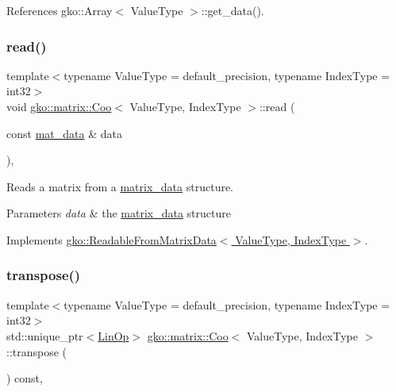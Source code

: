 References gko\+::\+Array$<$ Value\+Type $>$\+::get\+\_\+data().

\mbox{\label{classgko_1_1matrix_1_1Coo_ac0d4aeb19d9f55b62bea18bad1a408f5}} 
\subsubsection{\texorpdfstring{read()}{read()}}
{\footnotesize\ttfamily template$<$typename Value\+Type = default\+\_\+precision, typename Index\+Type = int32$>$ \\
void \hyperlink{classgko_1_1matrix_1_1Coo}{gko\+::matrix\+::\+Coo}$<$ Value\+Type, Index\+Type $>$\+::read (\begin{DoxyParamCaption}\item[{const \hyperlink{structgko_1_1matrix__data}{mat\+\_\+data} \&}]{data }\end{DoxyParamCaption})\hspace{0.3cm}{\ttfamily [override]}, {\ttfamily [virtual]}}



Reads a matrix from a \hyperlink{structgko_1_1matrix__data}{matrix\+\_\+data} structure. 


\begin{DoxyParams}{Parameters}
{\em data} & the \hyperlink{structgko_1_1matrix__data}{matrix\+\_\+data} structure \\
\hline
\end{DoxyParams}


Implements \hyperlink{classgko_1_1ReadableFromMatrixData_add5c12e23b3ac3c8fbd607fa5a9656bb}{gko\+::\+Readable\+From\+Matrix\+Data$<$ Value\+Type, Index\+Type $>$}.

\mbox{\label{classgko_1_1matrix_1_1Coo_ae6533c08c7f818d3bdd80b2871784dab}} 
\subsubsection{\texorpdfstring{transpose()}{transpose()}}
{\footnotesize\ttfamily template$<$typename Value\+Type = default\+\_\+precision, typename Index\+Type = int32$>$ \\
std\+::unique\+\_\+ptr$<$\hyperlink{classgko_1_1LinOp}{Lin\+Op}$>$ \hyperlink{classgko_1_1matrix_1_1Coo}{gko\+::matrix\+::\+Coo}$<$ Value\+Type, Index\+Type $>$\+::transpose (\begin{DoxyParamCaption}{ }\end{DoxyParamCaption}) const\hspace{0.3cm}{\ttfamily [override]}, {\ttfamily [virtual]}}



